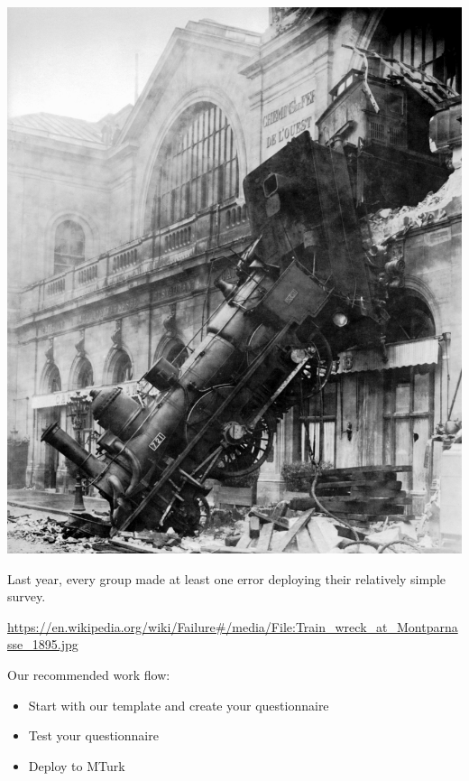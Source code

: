 \documentclass[aspectratio=169]{beamer}
\begin{document}
\begin{frame}

\begin{center}
\includegraphics[height=0.6\textheight]{figures/Train_wreck_at_Montparnasse_1895.jpg}
\end{center}

Last year, every group made at least one error deploying their relatively simple survey.

\vfill

{\tiny \url{https://en.wikipedia.org/wiki/Failure\#/media/File:Train_wreck_at_Montparnasse_1895.jpg}}
\end{frame}
\begin{frame}

Our recommended work flow:
\begin{itemize}
\item Start with our template and create your questionnaire
\item Test your questionnaire
\item Deploy to MTurk
\end{itemize}

\end{frame}
\end{document}
